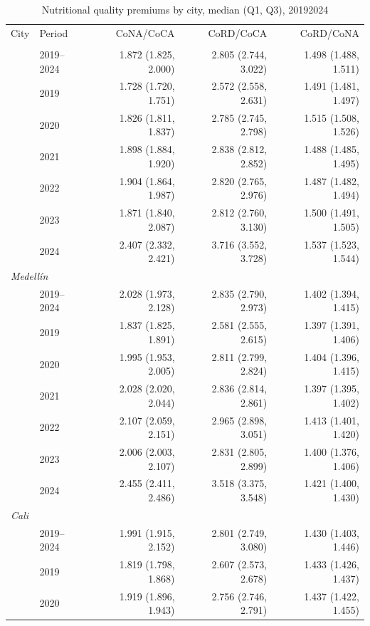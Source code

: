 \begin{table}[htbp]
\centering\small
\caption{Nutritional quality premiums by city, median (Q1, Q3), 2019\textendash{}2024}
\label{tab:cost_premiums_median}
\begin{tabular}{llrrr}
\toprule
City & Period & CoNA/CoCA & CoRD/CoCA & CoRD/CoNA \\
\addlinespace[2pt]
\midrule
\multicolumn{5}{l}{\textit{Bogotá}} \\
 & 2019–2024 & 1.872 (1.825, 2.000) & 2.805 (2.744, 3.022) & 1.498 (1.488, 1.511) \\
 & 2019 & 1.728 (1.720, 1.751) & 2.572 (2.558, 2.631) & 1.491 (1.481, 1.497) \\
 & 2020 & 1.826 (1.811, 1.837) & 2.785 (2.745, 2.798) & 1.515 (1.508, 1.526) \\
 & 2021 & 1.898 (1.884, 1.920) & 2.838 (2.812, 2.852) & 1.488 (1.485, 1.495) \\
 & 2022 & 1.904 (1.864, 1.987) & 2.820 (2.765, 2.976) & 1.487 (1.482, 1.494) \\
 & 2023 & 1.871 (1.840, 2.087) & 2.812 (2.760, 3.130) & 1.500 (1.491, 1.505) \\
 & 2024 & 2.407 (2.332, 2.421) & 3.716 (3.552, 3.728) & 1.537 (1.523, 1.544) \\
\midrule
\multicolumn{5}{l}{\textit{Medellín}} \\
 & 2019–2024 & 2.028 (1.973, 2.128) & 2.835 (2.790, 2.973) & 1.402 (1.394, 1.415) \\
 & 2019 & 1.837 (1.825, 1.891) & 2.581 (2.555, 2.615) & 1.397 (1.391, 1.406) \\
 & 2020 & 1.995 (1.953, 2.005) & 2.811 (2.799, 2.824) & 1.404 (1.396, 1.415) \\
 & 2021 & 2.028 (2.020, 2.044) & 2.836 (2.814, 2.861) & 1.397 (1.395, 1.402) \\
 & 2022 & 2.107 (2.059, 2.151) & 2.965 (2.898, 3.051) & 1.413 (1.401, 1.420) \\
 & 2023 & 2.006 (2.003, 2.107) & 2.831 (2.805, 2.899) & 1.400 (1.376, 1.406) \\
 & 2024 & 2.455 (2.411, 2.486) & 3.518 (3.375, 3.548) & 1.421 (1.400, 1.430) \\
\midrule
\multicolumn{5}{l}{\textit{Cali}} \\
 & 2019–2024 & 1.991 (1.915, 2.152) & 2.801 (2.749, 3.080) & 1.430 (1.403, 1.446) \\
 & 2019 & 1.819 (1.798, 1.868) & 2.607 (2.573, 2.678) & 1.433 (1.426, 1.437) \\
 & 2020 & 1.919 (1.896, 1.943) & 2.756 (2.746, 2.791) & 1.437 (1.422, 1.455) \\

\end{tabular}
\end{table}
